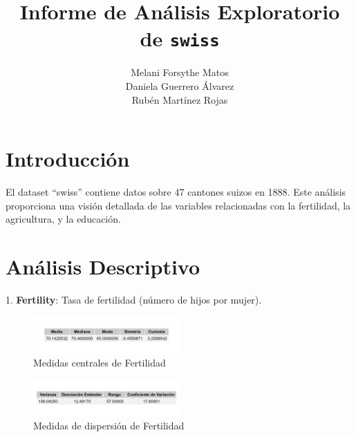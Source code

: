\documentclass{article}
\title{Informe de Análisis Exploratorio de \texttt{swiss}}
\author{
  Melani Forsythe Matos \\
  Daniela Guerrero Álvarez \\
  Rubén Martínez Rojas
}
\date{} %
\begin{document}
\maketitle

\newpage %

\section{Introducción}
El dataset ``swiss'' contiene datos sobre 47 cantones suizos en 1888. Este análisis proporciona una visión detallada de las variables relacionadas con la fertilidad, la agricultura, y la educación.

\section*{Análisis Descriptivo}

1. \textbf{Fertility}: Tasa de fertilidad (número de hijos por mujer).
\begin{figure}[H]
 \centering
 \includegraphics[width=0.5\textwidth]{Swiss/Fertility_central.png}
 \caption{Medidas centrales de Fertilidad}
\end{figure}

\begin{figure}[H]
 \centering
 \includegraphics[width=0.5\textwidth]{Swiss/Fertility_dispersion.png}
 \caption{Medidas de dispersión de Fertilidad}
\end{figure}
\end{document}
